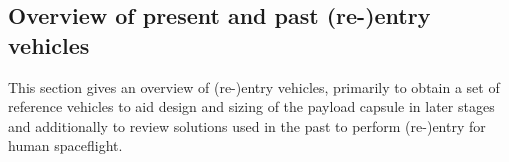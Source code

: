 \subsection{Overview of present and past (re-)entry vehicles}\label{cha:past missions}
This section gives an overview of (re-)entry vehicles, primarily to obtain a set of reference vehicles to aid design and sizing of the payload capsule in later stages and additionally to review solutions used in the past to perform (re-)entry for human spaceflight.






